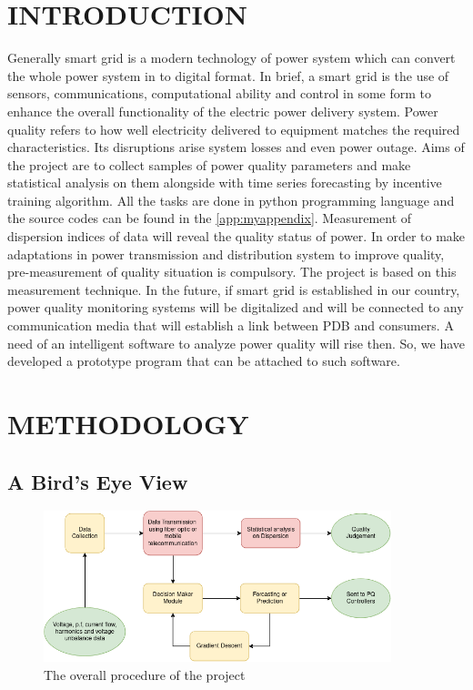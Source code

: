 \documentclass[a4paper,12pt,oneside]{book}
\begin{document}
\chapter{INTRODUCTION}\label{chap:intro}
Generally smart grid is a modern technology of power system which can convert the whole power system in to digital format. In brief, a smart grid is the use of sensors, communications, computational ability and control in some form to enhance the overall functionality of the electric power delivery system\cite{6497752}. Power quality refers to how well electricity delivered to equipment matches the required characteristics\cite{clou2023}. Its disruptions arise system losses and even power outage. 
Aims of the project are to collect samples of power quality parameters and make statistical analysis on them alongside with time series forecasting by incentive training algorithm. All the tasks are done in python programming language and the source codes can be found in the \autoref{app:myappendix}. Measurement of dispersion indices of data will reveal the quality status of power. In order to make adaptations in power transmission and distribution system to improve quality, pre-measurement of quality situation is compulsory. The project is based on this measurement technique.
In the future, if smart grid is established in our country, power quality monitoring systems will be digitalized and will be connected to any communication media that will establish a link between PDB and consumers. A need of an intelligent software to analyze power quality will rise then. So, we have developed a prototype program that can be attached to such software.



\newpage
\chapter{METHODOLOGY}\label{chap:method}
\label{sec:methods}

\section{A Bird's Eye View}

\begin{figure}[htp]
\centering
\includegraphics[width=0.9\textwidth]{Figures/flow-chart.png} 
\caption{The overall procedure of the project}
\label{fig:flowchart}
\end{figure}
\end{document}
